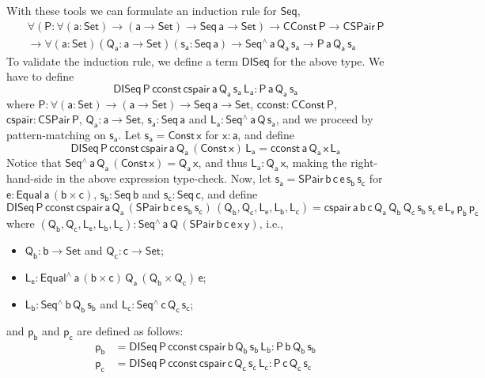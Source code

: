 \documentclass[acmsmall,screen,review,anonymous]{acmart}
\theoremstyle{definition}
\begin{document}
With these tools we can formulate an induction rule for $\mathsf{Seq}$,
\begin{multline*}
\mathsf{\forall (P : \forall (a : Set) \to (a \to Set) \to Seq\,a \to Set)}
\mathsf{\to CConst\,P \to CSPair\,P} \\
\mathsf{\to \forall (a : Set)(Q_a : a \to Set)(s_a : Seq\,a) \to Seq^{\wedge}\,a\,Q_a\,s_a \to P\,a\,Q_a\,s_a}
\end{multline*}
To validate the induction rule, we define a term $\mathsf{DISeq}$ for the above type.
We have to define
\[
\mathsf{DISeq\,P\,cconst\,cspair\,a\,Q_a\,s_a\,L_a : P\,a\,Q_a\,s_a}
\]
where
$\mathsf{P : \forall (a : Set) \to (a \to Set) \to Seq\,a \to Set}$,
$\mathsf{cconst : CConst\,P}$,
$\mathsf{cspair : CSPair\,P}$,
$\mathsf{Q_a : a \to Set}$, $\mathsf{s_a : Seq\,a}$
and $\mathsf{L_a : Seq^{\wedge}\,a\,Q\,s_a}$,
and we proceed by pattern-matching on $\mathsf{s_a}$.
Let $\mathsf{s_a = Const\,x}$ for $\mathsf{x : a}$, and define
\[
\mathsf{DISeq\,P\,cconst\,cspair\,a\,Q_a\,(Const\,x)\,L_a = cconst\,a\,Q_a\,x\,L_a}
\]
Notice that $\mathsf{Seq^{\wedge}\,a\,Q_a\,(Const\,x) = Q_a\,x}$, and thus $\mathsf{L_a : Q_a\,x}$,
making the right-hand-side in the above expression type-check.
Now, let $\mathsf{s_a = SPair\,b\,c\,e\,s_b\,s_c}$
for $\mathsf{e : Equal\,a\,(b \times c)}$, $\mathsf{s_b : Seq\,b}$ and $\mathsf{s_c : Seq\,c}$,
and define
\[
\mathsf{DISeq\,P\,cconst\,cspair\,a\,Q_a\,(SPair\,b\,c\,e\,s_b\,s_c)\,(Q_b, Q_c, L_e, L_b, L_c)
	= cspair\,a\,b\,c\,Q_a\,Q_b\,Q_c\,s_b\,s_c\,e\,L_e\,p_b\,p_c}
\]
where $\mathsf{(Q_b, Q_c, L_e, L_b, L_c) : Seq^{\wedge}\,a\,Q\,(SPair\,b\,c\,e\,x\,y)}$, i.e.,
\begin{itemize}
\item $\mathsf{Q_b : b \to Set}$ and $\mathsf{Q_c : c \to Set}$;
\item $\mathsf{L_e : Equal^{\wedge}\,a\, (b \times c)\, Q_a\, (Q_b \times Q_c) \, e}$;
\item $\mathsf{L_b : Seq^{\wedge}\,b\,Q_b\,s_b}$ and $\mathsf{L_c : Seq^{\wedge}\,c\,Q_c\,s_c}$;
\end{itemize}
and $\mathsf{p_b}$ and $\mathsf{p_c}$ are defined as follows:
\begin{align*}
\mathsf{p_b} &=\mathsf{DISeq\,P\,cconst\,cspair\,b\,Q_b\,s_b\,L_b : P\,b\,Q_b\,s_b} \\
\mathsf{p_c} &=\mathsf{DISeq\,P\,cconst\,cspair\,c\,Q_c\,s_c\,L_c : P\,c\,Q_c\,s_c}
\end{align*}
\end{document}
